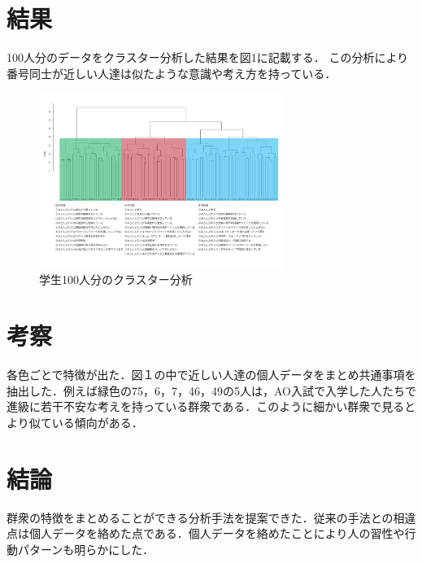 \documentclass[uplatex,twocolumn,dvipdfmx]{jsarticle}
\begin{document}
\section{結果}
100人分のデータをクラスター分析した結果を図1に記載する．
この分析により番号同士が近しい人達は似たような意識や考え方を持っている．
\begin{figure}[h]
\centering
\includegraphics[width=8cm]{clusterresults.pdf}
\caption{学生100人分のクラスター分析}\label{学生100人分のクラスター分析}
\end{figure}


\section{考察}
各色ごとで特徴が出た．図１の中で近しい人達の個人データをまとめ共通事項を抽出した．例えば緑色の75，6，7，46，49の5人は，AO入試で入学した人たちで進級に若干不安な考えを持っている群衆である．このように細かい群衆で見るとより似ている傾向がある．
\section{結論}
群衆の特徴をまとめることができる分析手法を提案できた．従来の手法との相違点は個人データを絡めた点である．個人データを絡めたことにより人の習性や行動パターンも明らかにした．

    


\end{document}

